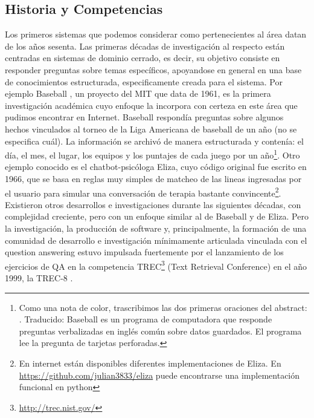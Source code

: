\subsection{Historia y Competencias}
\label{subsec:historia}
\label{subsec:competencias}
\cerrada
Los primeros sistemas que podemos considerar como pertenecientes al área datan de los años sesenta. Las primeras décadas de investigación al respecto están centradas en sistemas de dominio cerrado, es decir, su objetivo consiste en responder preguntas sobre temas específicos, apoyandose en general en una base de conocimientos estructurada, especificamente creada para el sistema. Por ejemplo Baseball \cite{BASEBALL}, un proyecto del MIT que data de 1961, es la primera investigación académica cuyo enfoque la incorpora con certeza en este área que pudimos encontrar en Internet. Baseball respondía preguntas sobre algunos hechos vinculados al torneo de la Liga Americana de baseball de un año (no se especifica cuál). La información se archivó de manera estructurada y contenía: el día, el mes, el lugar, los equipos y los puntajes de cada juego por un año\footnote{Como una nota de color, trascribimos las dos primeras oraciones del abstract: . Traducido: Baseball es un programa de computadora que responde preguntas verbalizadas en inglés común sobre datos guardados. El programa lee la pregunta de tarjetas perforadas.}. Otro ejemplo conocido es el chatbot-psicóloga Eliza, cuyo código original fue escrito en 1966, que se basa en reglas muy simples de matcheo de las lineas ingresadas por el usuario para simular una conversación de terapia bastante convincente\footnote{En internet están disponibles diferentes implementaciones de Eliza. En \url{https://github.com/julian3833/eliza} puede encontrarse una implementación funcional en python}. Existieron otros desarrollos e investigaciones durante las siguientes décadas, con complejidad creciente, pero con un enfoque similar al de Baseball y de Eliza. Pero la investigación, la producción de software y, principalmente, la formación de una comunidad de desarrollo e investigación mínimamente articulada vinculada con el question answering estuvo impulsada fuertemente por el lanzamiento de los ejercicios de QA en la competencia TREC\footnote{\url{http://trec.nist.gov/}} (Text Retrieval Conference) en el año 1999, la TREC-8 \cite{TREC8}.

